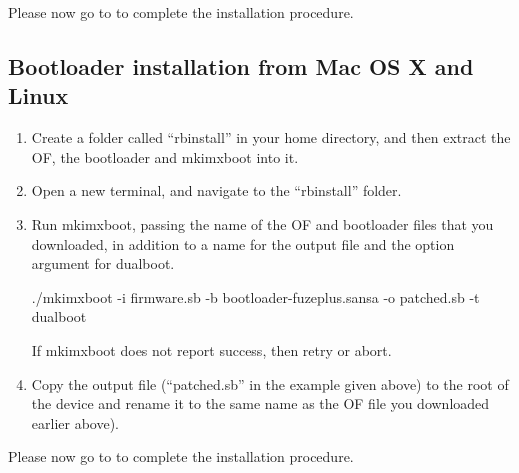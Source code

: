 Please now go to  to complete the installation procedure.

\subsection{Bootloader installation from Mac OS X and Linux}

\begin{enumerate}

\item Create a folder called ``rbinstall'' in your home directory, and then
  extract the OF, the bootloader and mkimxboot into it.

\item Open a new terminal, and navigate to the ``rbinstall'' folder.

\item Run mkimxboot, passing the name of the OF and bootloader files that you
  downloaded, in addition to a name for the output file and the option argument
  for dualboot.

  \begin{code}[firstline=\opt{fuzeplus}{1},%
               lastline=\opt{fuzeplus}{1}]
    ./mkimxboot -i firmware.sb -b bootloader-fuzeplus.sansa -o patched.sb -t dualboot

  \end{code}

  If mkimxboot does not report success, then retry or abort.

\item Copy the output file (``patched.sb'' in the example given above) to the
  root of the device and rename it to the same name as the OF file you downloaded earlier
    above).
\end{enumerate}

Please now go to  to complete the installation procedure.

